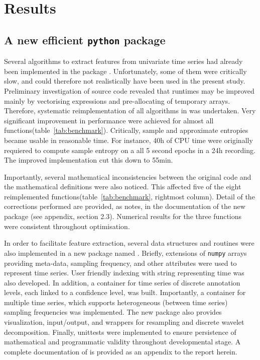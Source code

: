 
\section{Results} \label{results}

\subsection{A new efficient \texttt{python} package}
Several algorithms to extract features from univariate time series had already
been implemented in the \py{} package \pyeeg{}\cite{bao_pyeeg:_2011}.
Unfortunately, some of them were critically slow, and could therefore not realistically have been used in the present study.
Preliminary investigation of \pyeeg{} source code revealed that runtimes may be improved mainly by vectorising expressions and pre-allocating of temporary arrays.
Therefore, systematic reimplementation of all algorithms in \pyeeg{} was undertaken.
Very significant improvement in performance were achieved for almost all functions(table~\ref{tab:benchmark}).
Critically, sample and approximate entropies\cite{richman_physiological_2000} became usable in
reasonable time.
For instance, 40h of CPU time were originally  requiered to compute sample entropy on a all 5 second epochs in a 24h recording.
The improved implementation cut this down to 55min.


Importantly, several mathematical inconsistencies between the original code and the mathematical definitions were also noticed.
This affected five of the eight reimplemented functions(table~\ref{tab:benchmark}, rightmost column).
Detail of the corrections performed are provided, as notes, in the documentation of the new package (see appendix, section 2.3).
Numerical results for the three  functions were consistent throughout optimisation.

In order to facilitate feature extraction, several data structures and routines were also implemented
in a new \py{} package named \pr{}.
Briefly, extensions of \texttt{numpy} arrays\cite{walt_numpy_2011} providing
meta-data, sampling frequency, and other attributes were used to represent time series.
User friendly indexing with string representing time was also developed.
In addition, a container for time series of discrete annotation levels, each linked to a confidence level, was built.
Importantly, a container for multiple time series, which supports heterogeneous (between time series) sampling frequencies was implemented.
The new package also provides visualization, input/output, and wrappers for resampling and discrete wavelet decomposition.
Finally, unittests were implemented to ensure persistence of mathematical and programmatic validity throughout developmental stage.
A complete documentation of \pr{} is provided as an appendix to the report herein.

